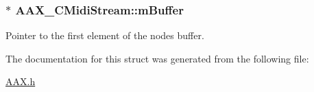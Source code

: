 \subsubsection[{m\+Buffer}]{$\ast$ A\+A\+X\+\_\+\+C\+Midi\+Stream\+::m\+Buffer}\label{a00025_a5011ea886dce57b382c23b82e56d3000}


Pointer to the first element of the node\textquotesingle{}s buffer. 



The documentation for this struct was generated from the following file\+:\begin{DoxyCompactItemize}
\item 
\hyperlink{a00149}{A\+A\+X.\+h}\end{DoxyCompactItemize}
